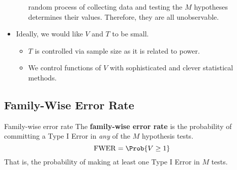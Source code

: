 \begin{itemize}
\begin{itemize}
                        random process of collecting data and testing the $ M $
                        hypotheses determines their values. Therefore, they are all unobservable.
            \end{itemize}
      \item Ideally, we would like $ V $ and $ T $ to be small.
            \begin{itemize}
                  \item $ T $ is controlled via sample size as it is related to power.
                  \item We control functions of $ V $ with sophisticated and clever statistical methods.
            \end{itemize}
\end{itemize}
\subsection{Family-Wise Error Rate}
\begin{Definition}{Family-wise error rate}{}
      The \textbf{family-wise error rate} is the probability of committing a Type I Error in \emph{any} of the
      $M$ hypothesis tests.
      \[ \FWER=\Prob{V\ge 1} \]
      That is, the probability of making at least one Type I Error in $ M $ tests.
\end{Definition}
